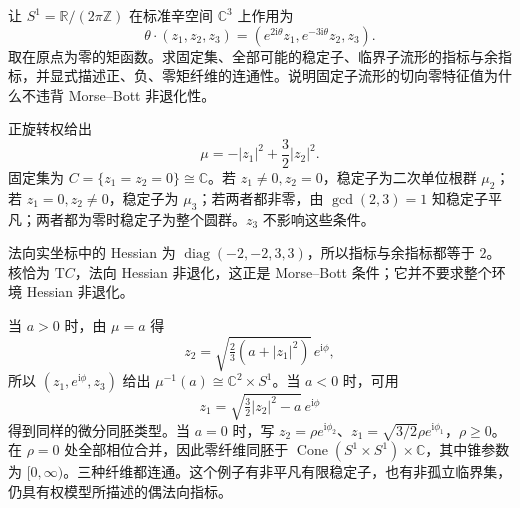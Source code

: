 \begin{exercise}\label{g4:ex:12:mixed-weights-fixed-line}
	让 \(S^1=\mathbb R/(2\pi\mathbb Z)\) 在标准辛空间 \(\mathbb C^3\) 上作用为
	\[
		\theta\cdot(z_1,z_2,z_3)
		=(e^{2\mathrm i\theta}z_1,e^{-3\mathrm i\theta}z_2,z_3).
	\]
	取在原点为零的矩函数。求固定集、全部可能的稳定子、临界子流形的指标与余指标，并显式描述正、负、零矩纤维的连通性。说明固定子流形的切向零特征值为什么不违背 Morse–Bott 非退化性。
\end{exercise}
\begin{solution}
	正旋转权给出
	\[
		\mu=-|z_1|^2+\frac32|z_2|^2.
	\]
	固定集为 \(C=\{z_1=z_2=0\}\cong\mathbb C\)。若 \(z_1\neq0,z_2=0\)，稳定子为二次单位根群 \(\mu_2\)；若 \(z_1=0,z_2\neq0\)，稳定子为 \(\mu_3\)；若两者都非零，由 \(\gcd(2,3)=1\) 知稳定子平凡；两者都为零时稳定子为整个圆群。\(z_3\) 不影响这些条件。

	法向实坐标中的 Hessian 为 \(\operatorname{diag}(-2,-2,3,3)\)，所以指标与余指标都等于 \(2\)。核恰为 \(\mathrm TC\)，法向 Hessian 非退化，这正是 Morse–Bott 条件；它并不要求整个环境 Hessian 非退化。

	当 \(a>0\) 时，由 \(\mu=a\) 得
	\[
		z_2=\sqrt{\tfrac23(a+|z_1|^2)}\,e^{\mathrm i\phi},
	\]
	所以 \((z_1,e^{\mathrm i\phi},z_3)\) 给出 \(\mu^{-1}(a)\cong\mathbb C^2\times S^1\)。当 \(a<0\) 时，可用
	\[
		z_1=\sqrt{\tfrac32|z_2|^2-a}\,e^{\mathrm i\phi}
	\]
	得到同样的微分同胚类型。当 \(a=0\) 时，写 \(z_2=\rho e^{\mathrm i\phi_2}\)、\(z_1=\sqrt{3/2}\rho e^{\mathrm i\phi_1}\)，\(\rho\geq0\)。在 \(\rho=0\) 处全部相位合并，因此零纤维同胚于 \(\operatorname{Cone}(S^1\times S^1)\times\mathbb C\)，其中锥参数为 \([0,\infty)\)。三种纤维都连通。这个例子有非平凡有限稳定子，也有非孤立临界集，仍具有权模型所描述的偶法向指标。
\end{solution}

